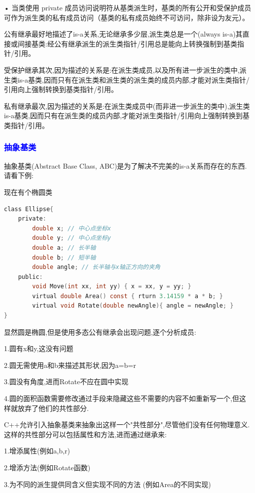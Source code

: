 \documentclass[UTF8]{ctexart}
\begin{document}
• 当类使用 private 成员访问说明符从基类派生时，基类的所有公开和受保护成员可作为派生类的私有成员访问（基类的私有成员始终不可访问，除非设为友元）。

公有继承最好地描述了is-a关系,无论继承多少层,派生类总是一个(always is-a)其直接或间接基类:经公有继承派生的派生类指针/引用总是能向上转换强制到基类指针/引用。

受保护继承其次,因为描述的关系是:在派生类成员,以及所有进一步派生的类中,派生类is-a基类,因而只有在派生类和派生类的派生类的成员内部,才能对派生类指针/引用向上强制转换到基类指针/引用。

私有继承最次,因为描述的关系是:在派生类成员中(而非进一步派生的类中),派生类is-a基类,因而只有在派生类的成员内部,才能对派生类指针/引用向上强制转换到基类指针/引用。

\subsubsection{\textcolor{blue}{抽象基类}}
抽象基类(Abstract Base Class, ABC)是为了解决不完美的is-a关系而存在的东西.请看下例:

现在有个椭圆类
\begin{lstlisting}[language = C,basicstyle=\small\ttfamily]
class Ellipse{    
    private:        
        double x; // 中心点坐标x 
        double y; // 中心点坐标y   
        double a; // 长半轴       
        double b; // 短半轴       
        double angle; // 长半轴与x轴正方向的夹角    
    public:        
        void Move(int xx, int yy) { x = xx, y = yy; }  
        virtual double Area() const { rturn 3.14159 * a * b; }
        virtual void Rotate(double newAngle){ angle = newAngle; }
}
\end{lstlisting}

显然圆是椭圆,但是使用多态公有继承会出现问题,逐个分析成员:

1.圆有x和y,这没有问题

2.圆无需使用a和b来描述其形状,因为a=b=r

3.圆没有角度,进而Rotate不应在圆中实现

4.圆的面积函数需要修改通过手段来隐藏这些不需要的内容不如重新写一个,但这样就放弃了他们的共性部分.

C++允许引入抽象基类来抽象出这样一个"共性部分",尽管他们没有任何物理意义.这样的共性部分可以包括属性和方法,进而通过继承来:

1.增添属性(例如a,b,r)

2.增添方法(例如Rotate函数)

3.为不同的派生提供同含义但实现不同的方法
(例如Area的不同实现)
\end{document}
